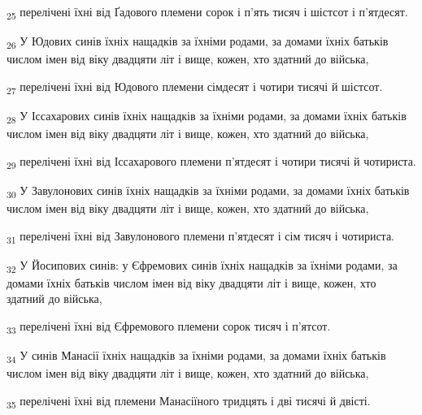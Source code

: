 \begin{tcolorbox}
\textsubscript{25} перелічені їхні від Ґадового племени сорок і п'ять тисяч і шістсот і п'ятдесят.
\end{tcolorbox}
\begin{tcolorbox}
\textsubscript{26} У Юдових синів їхніх нащадків за їхніми родами, за домами їхніх батьків числом імен від віку двадцяти літ і вище, кожен, хто здатний до війська,
\end{tcolorbox}
\begin{tcolorbox}
\textsubscript{27} перелічені їхні від Юдового племени сімдесят і чотири тисячі й шістсот.
\end{tcolorbox}
\begin{tcolorbox}
\textsubscript{28} У Іссахарових синів їхніх нащадків за їхніми родами, за домами їхніх батьків числом імен від віку двадцяти літ і вище, кожен, хто здатний до війська,
\end{tcolorbox}
\begin{tcolorbox}
\textsubscript{29} перелічені їхні від Іссахарового племени п'ятдесят і чотири тисячі й чотириста.
\end{tcolorbox}
\begin{tcolorbox}
\textsubscript{30} У Завулонових синів їхніх нащадків за їхніми родами, за домами їхніх батьків числом імен від віку двадцяти літ і вище, кожен, хто здатний до війська,
\end{tcolorbox}
\begin{tcolorbox}
\textsubscript{31} перелічені їхні від Завулонового племени п'ятдесят і сім тисяч і чотириста.
\end{tcolorbox}
\begin{tcolorbox}
\textsubscript{32} У Йосипових синів: у Єфремових синів їхніх нащадків за їхніми родами, за домами їхніх батьків числом імен від віку двадцяти літ і вище, кожен, хто здатний до війська,
\end{tcolorbox}
\begin{tcolorbox}
\textsubscript{33} перелічені їхні від Єфремового племени сорок тисяч і п'ятсот.
\end{tcolorbox}
\begin{tcolorbox}
\textsubscript{34} У синів Манасії їхніх нащадків за їхніми родами, за домами їхніх батьків числом імен від віку двадцяти літ і вище, кожен, хто здатний до війська,
\end{tcolorbox}
\begin{tcolorbox}
\textsubscript{35} перелічені їхні від племени Манасіїного тридцять і дві тисячі й двісті.
\end{tcolorbox}
